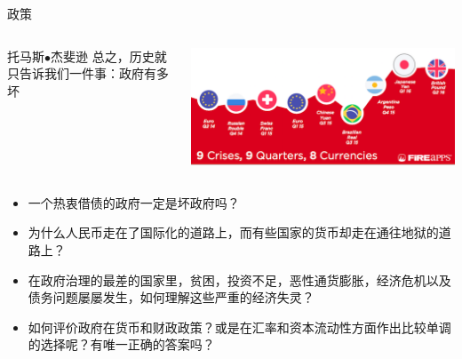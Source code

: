 \documentclass[10pt,hyperref={CJKbookmarks=true},xcolor=dvipsnames,aspectratio=169]{beamer}
\begin{document}
\begin{frame}{政策}
\begin{columns}
	\begin{column}{0.3\textwidth}
		\begin{block}{托马斯$\bullet$杰斐逊}
			总之，历史就只告诉我们一件事：政府有多坏
		\end{block}
	\end{column}
	\begin{column}{0.7\textwidth}
		\centering
		\includegraphics[scale=0.5]{fig/bop/currency}
	\end{column}
\end{columns}
\begin{itemize}
	\item 一个热衷借债的政府一定是坏政府吗？
	\item 为什么人民币走在了国际化的道路上，而有些国家的货币却走在通往地狱的道路上？
	\item 在政府治理的最差的国家里，贫困，投资不足，恶性通货膨胀，经济危机以及债务问题屡屡发生，如何理解这些严重的经济失灵？
	\item 如何评价政府在货币和财政政策？或是在汇率和资本流动性方面作出比较单调的选择呢？有唯一正确的答案吗？
	
\end{itemize}	
\end{frame}
\end{document}
